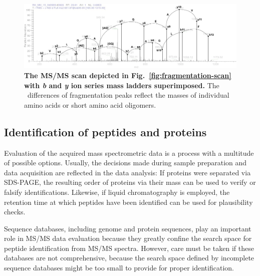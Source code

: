 \begin{figure}
\includegraphics[width=\textwidth]{figures/ms2-scan-b-y-1.jpg}
\caption{
{\bf The MS/MS scan depicted in Fig.~\ref{fig:fragmentation-scan} with {\em b} and 
{\em y} ion series mass ladders superimposed.} 
The \mz~differences of fragmentation peaks reflect the masses of individual amino
acids or short amino acid oligomers.
}
\label{fig:fragmentation-scan-b-y}
\end{figure}


\subsection{Identification of peptides and proteins}

Evaluation of the acquired mass spectrometric data is a process with a multitude
of possible options.
Usually, the decisions made during sample preparation and data acquisition are
reflected in the data analysis: If proteins were separated via SDS-PAGE, the
resulting order of proteins via their mass can be used to verify or falsify 
identifications.
Likewise, if liquid chromatography is employed, the retention time at which
peptides have been identified can be used for plausibility checks.

Sequence databases, including genome and protein sequences, play an important
role in MS/MS data evaluation because they greatly confine the search space
for peptide identification from MS/MS spectra.
However, care must be taken if these databases are not comprehensive, because
the search space defined by incomplete sequence databases might be too small
to provide for proper identification.




